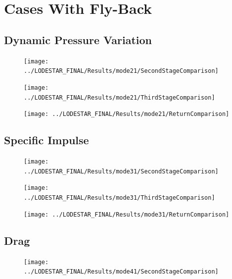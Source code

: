 \section{Cases With Fly-Back}

\subsection{Dynamic Pressure Variation}
\begin{figure}[th]
\centering
\texttt{[image: ../LODESTAR\_FINAL/Results/mode21/SecondStageComparison]}
\caption{}
\label{fig:SecondStageComparison9}
\end{figure}

\begin{figure}[th]
\centering
\texttt{[image: ../LODESTAR\_FINAL/Results/mode21/ThirdStageComparison]}
\caption{}
\label{fig:ThirdStageComparison9}
\end{figure}

\begin{figure}[th]
\centering
\texttt{[image: ../LODESTAR\_FINAL/Results/mode21/ReturnComparison]}
\caption{}
\label{fig:ReturnComparison}
\end{figure}


\subsection{Specific Impulse}
\begin{figure}[th]
\centering
\texttt{[image: ../LODESTAR\_FINAL/Results/mode31/SecondStageComparison]}
\caption{}
\label{fig:SecondStageComparison10}
\end{figure}

\begin{figure}[th]
\centering
\texttt{[image: ../LODESTAR\_FINAL/Results/mode31/ThirdStageComparison]}
\caption{}
\label{fig:ThirdStageComparison10}
\end{figure}

\begin{figure}[th]
\centering
\texttt{[image: ../LODESTAR\_FINAL/Results/mode31/ReturnComparison]}
\caption{}
\label{fig:ReturnComparison10}
\end{figure}


\subsection{Drag}
\begin{figure}[th]
\centering
\texttt{[image: ../LODESTAR\_FINAL/Results/mode41/SecondStageComparison]}
\caption{}
\label{fig:SecondStageComparison11}
\end{figure}

